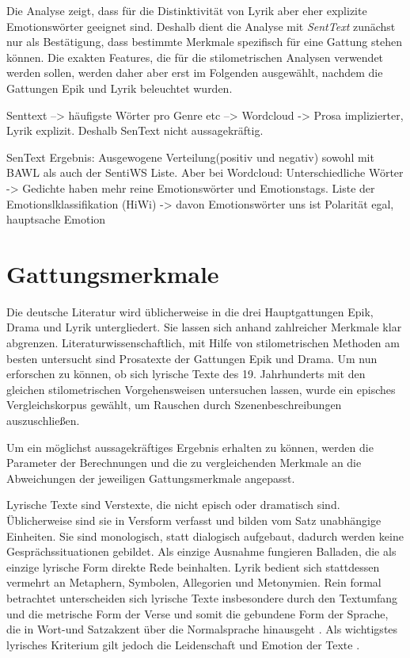 \documentclass[a4paper,10p]{article}
\begin{document}
Die Analyse zeigt, dass für die Distinktivität von Lyrik aber eher explizite Emotionswörter geeignet sind. Deshalb dient die Analyse mit \textit{SentText} zunächst nur als Bestätigung, dass bestimmte Merkmale spezifisch für eine Gattung stehen können. Die exakten Features, die für die stilometrischen Analysen verwendet werden sollen, werden daher aber erst im Folgenden ausgewählt, nachdem die Gattungen Epik und Lyrik beleuchtet wurden.\par 



Senttext --> häufigste Wörter pro Genre etc --> Wordcloud
-> Prosa implizierter, Lyrik explizit. Deshalb SenText nicht aussagekräftig.

SenText Ergebnis: Ausgewogene Verteilung(positiv und negativ) sowohl mit BAWL als auch der SentiWS Liste. Aber bei Wordcloud: Unterschiedliche Wörter -> Gedichte haben mehr reine Emotionswörter und Emotionstags.
Liste der Emotionslklassifikation (HiWi) -> davon Emotionswörter
uns ist Polarität egal, hauptsache Emotion


\section{Gattungsmerkmale}
Die deutsche Literatur wird üblicherweise in die drei Hauptgattungen Epik, Drama und Lyrik untergliedert. Sie lassen sich anhand zahlreicher Merkmale klar abgrenzen. Literaturwissenschaftlich, mit Hilfe von stilometrischen Methoden am besten untersucht sind Prosatexte der Gattungen Epik und Drama. Um nun erforschen zu können, ob sich lyrische Texte des 19. Jahrhunderts mit den gleichen stilometrischen Vorgehensweisen untersuchen lassen, wurde ein episches Vergleichskorpus gewählt, um Rauschen durch Szenenbeschreibungen auszuschließen. \par 

Um ein möglichst aussagekräftiges Ergebnis erhalten zu können, werden die Parameter der Berechnungen und die zu vergleichenden Merkmale an die Abweichungen der jeweiligen Gattungsmerkmale angepasst. \par 

Lyrische Texte sind Verstexte, die nicht episch oder dramatisch sind. Üblicherweise sind sie in Versform verfasst und bilden vom Satz unabhängige Einheiten. Sie sind monologisch, statt dialogisch aufgebaut, dadurch werden keine Gesprächssituationen gebildet. Als einzige Ausnahme fungieren Balladen, die als einzige lyrische Form direkte Rede beinhalten. Lyrik bedient sich stattdessen vermehrt an Metaphern, Symbolen, Allegorien und Metonymien. Rein formal betrachtet unterscheiden sich lyrische Texte insbesondere durch den Textumfang und die metrische Form der Verse und somit die gebundene Form der Sprache, die in Wort-und Satzakzent über die Normalsprache hinausgeht \citep[vgl.][S. 111]{Krah2006}. Als wichtigstes lyrisches Kriterium gilt jedoch die Leidenschaft und Emotion der Texte \citep[vgl.][S. 462-464]{SchweikleGunther;Burdorf2007}. \par 
\end{document}
